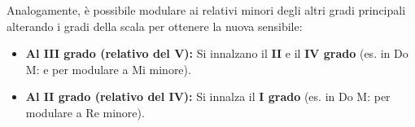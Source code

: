\begin{regola}
	\label{reg:mod_altri_minori}
	Analogamente, è possibile modulare ai relativi minori degli altri gradi principali alterando i gradi della scala per ottenere la nuova sensibile:
	
	\begin{itemize}
		\item \textbf{Al III grado (relativo del V):} Si innalzano il \textbf{II} e il \textbf{IV grado} (es. in Do M: \Fadiesis  e \Rediesis  per modulare a Mi minore).
		\item \textbf{Al II grado (relativo del IV):} Si innalza il \textbf{I grado} (es. in Do M: \Dodiesis  per modulare a Re minore).
	\end{itemize}
\end{regola}